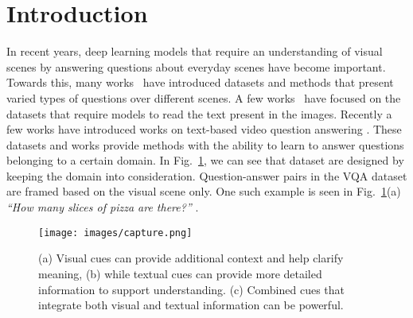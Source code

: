 \documentclass[10pt,twocolumn,letterpaper]{article}
\begin{document}



\section{Introduction}

\label{sec:intro}
In recent years, deep learning models that require an understanding of visual scenes by answering questions about everyday scenes have become important. Towards this, many works~\cite{first-vqa:2017,vcr:2019}
have introduced datasets and methods that present varied types of questions over different scenes. A few works~\cite{textVQA,stvqa,ocr-vqa,docvqa:2021, textvqg} have focused on the datasets that require models to read the text present in the images. Recently a few works have introduced works on text-based video question answering \cite{video_text_videoqa, newsvideoqa}. These datasets and works provide methods with the ability to learn to answer questions belonging to a certain domain. In Fig.~\ref{fig:main_fig}, we can see that dataset are designed by keeping the domain into consideration. Question-answer pairs in the VQA dataset are framed based on the visual scene only. One such example is seen in Fig.~\ref{fig:main_fig}(a) \textit{``How many slices of pizza are there?''} . 

\begin{figure}
    \centering
    \texttt{[image: images/capture.png]}
    \caption{(a) Visual cues can provide additional context and help clarify meaning, (b) while textual cues can provide more detailed information to support understanding. (c) Combined cues that integrate both visual and textual information can be powerful. 
    } 
    \label{fig:main_fig}
\end{figure}
\end{document}
